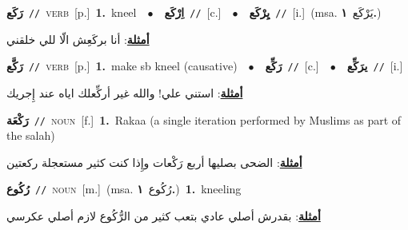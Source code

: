 \documentclass[10pt,a4paper,twoside]{article} %
\begin{document}
\begin{multicols}{2}
{\setlength\topsep{0pt}\textbf{\foreignlanguage{arabic}{رَكَع}}\ {\color{gray}\texttt{//}\color{black}}\ \textsc{verb}\ [p.]\ \textbf{1.}~kneel\ \ $\bullet$\ \ \setlength\topsep{0pt}\textbf{\foreignlanguage{arabic}{اِرْكَع}}\ {\color{gray}\texttt{//}\color{black}}\ [c.]\ \ $\bullet$\ \ \setlength\topsep{0pt}\textbf{\foreignlanguage{arabic}{يِرْكَع}}\ {\color{gray}\texttt{//}\color{black}}\ [i.]\ \color{gray}(msa. \foreignlanguage{arabic}{يَرْكَع}~\foreignlanguage{arabic}{\textbf{١.}})\color{black}\  \begin{flushright}\color{gray}\foreignlanguage{arabic}{\textbf{\underline{\foreignlanguage{arabic}{أمثلة}}}: أنا بركَعِش الّا للي خلقني}\end{flushright}\color{black}} \vspace{2mm}

{\setlength\topsep{0pt}\textbf{\foreignlanguage{arabic}{رَكَّع}}\ {\color{gray}\texttt{//}\color{black}}\ \textsc{verb}\ [p.]\ \textbf{1.}~make sb kneel (causative)\ \ $\bullet$\ \ \setlength\topsep{0pt}\textbf{\foreignlanguage{arabic}{رَكِّع}}\ {\color{gray}\texttt{//}\color{black}}\ [c.]\ \ $\bullet$\ \ \setlength\topsep{0pt}\textbf{\foreignlanguage{arabic}{يرَكِّع}}\ {\color{gray}\texttt{//}\color{black}}\ [i.]\  \begin{flushright}\color{gray}\foreignlanguage{arabic}{\textbf{\underline{\foreignlanguage{arabic}{أمثلة}}}: استني علي! والله غير أركِّعلك اياه عند إِجريك}\end{flushright}\color{black}} \vspace{2mm}

{\setlength\topsep{0pt}\textbf{\foreignlanguage{arabic}{رَكْعَة}}\ {\color{gray}\texttt{//}\color{black}}\ \textsc{noun}\ [f.]\ \textbf{1.}~Rakaa (a single iteration performed by Muslims as part of the salah)\  \begin{flushright}\color{gray}\foreignlanguage{arabic}{\textbf{\underline{\foreignlanguage{arabic}{أمثلة}}}: الضحى بصليها أربع رَكْعات وإِذا كنت كثير مستعجلة ركعتين}\end{flushright}\color{black}} \vspace{2mm}

{\setlength\topsep{0pt}\textbf{\foreignlanguage{arabic}{رُكُوع}}\ {\color{gray}\texttt{//}\color{black}}\ \textsc{noun}\ [m.]\ \color{gray}(msa. \foreignlanguage{arabic}{رُكُوع}~\foreignlanguage{arabic}{\textbf{١.}})\color{black}\ \textbf{1.}~kneeling\  \begin{flushright}\color{gray}\foreignlanguage{arabic}{\textbf{\underline{\foreignlanguage{arabic}{أمثلة}}}: بقدرش أصلي عادي بتعب كثير من الرُّكُوع لازم أصلي عكرسي}\end{flushright}\color{black}} \vspace{2mm}


\end{multicols}
\end{document}
